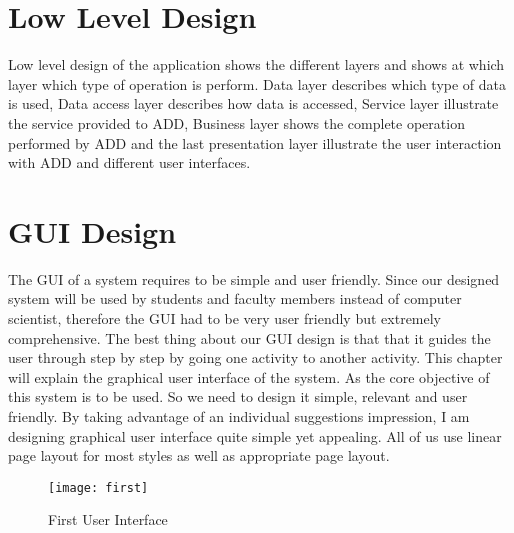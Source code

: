 \section{Low Level Design}

\par Low level design of the application shows the different layers and shows at which layer which type of operation is perform. Data layer describes which type of data is used, Data access layer describes how data is accessed, Service layer illustrate the service provided to ADD, Business layer shows the complete operation performed by ADD and the last presentation layer illustrate the user interaction with ADD and different user interfaces.

\section{GUI Design}
The GUI of a system requires to be simple and user friendly. Since our designed system will be used by students and faculty members instead of computer scientist, therefore the GUI had to be very user friendly but extremely comprehensive. The best thing about our GUI design is that that it guides the user through step by step by going one activity to another activity. This chapter will explain the graphical user interface of the system. As the core objective of this system is to be used. So we need to design it simple, relevant and user friendly. By taking advantage of an individual suggestions impression, I am designing graphical user interface quite simple yet appealing. All of us use linear page layout for most styles as well as appropriate page layout.
\begin{figure}[ht]
\centering
\texttt{[image: first]}
\caption{First User Interface}
\label{fig:first}
\end{figure}


